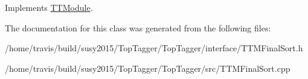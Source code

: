 Implements \hyperlink{classTTModule_a14e7c03fbf4ee1a5008c9344adc7c896}{T\-T\-Module}.



The documentation for this class was generated from the following files\-:\begin{DoxyCompactItemize}
\item 
/home/travis/build/susy2015/\-Top\-Tagger/\-Top\-Tagger/interface/T\-T\-M\-Final\-Sort.\-h\item 
/home/travis/build/susy2015/\-Top\-Tagger/\-Top\-Tagger/src/T\-T\-M\-Final\-Sort.\-cpp\end{DoxyCompactItemize}
